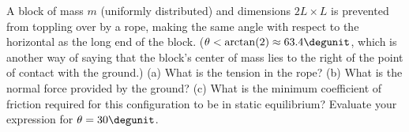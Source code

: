 %
A block of mass $m$ (uniformly distributed) and dimensions $2L \times
L$ is prevented from toppling over by a rope, making the same angle
with respect to the horizontal as the long end of the block. ($\theta
< \arctan(2) \approx 63.4\degunit$, which is another way of saying
that the block's center of mass lies to the right of the point of contact with the ground.)
%
(a) What is the tension in the rope?\answercheck\hwendpart
%
(b) What is the normal force provided by the ground?\answercheck\hwendpart
%
(c) What is the minimum coefficient of friction required for this
configuration to be in static equilibrium? Evaluate your expression
for $\theta = 30\degunit$.\answercheck
